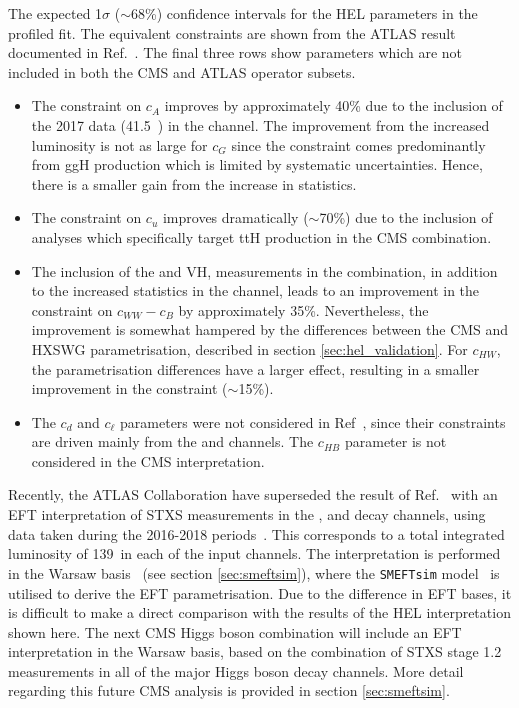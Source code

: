 \begin{table}[htb]
  \centering
  \renewcommand{\arraystretch}{1.3}
  \setlength{\tabcolsep}{15pt}
  \caption[Comparison to the HEL parameter constraints from a previous ATLAS result]
  {
    The expected 1$\sigma$ ($\sim$68\%) confidence intervals for the HEL parameters in the profiled fit. The equivalent constraints are shown from the ATLAS result documented in Ref.~\cite{ATL-PHYS-PUB-2017-018}. The final three rows show parameters which are not included in both the CMS and ATLAS operator subsets.
  }
  \label{tab:hel_atlas}
  
\end{table}

\begin{itemize}
    \item The constraint on $c_A$ improves by approximately 40\% due to the inclusion of the 2017 data (41.5~\fbinv) in the \Hgg channel. The improvement from the increased luminosity is not as large for $c_G$ since the constraint comes predominantly from ggH production which is limited by systematic uncertainties. Hence, there is a smaller gain from the increase in statistics.
    \item The constraint on $c_u$ improves dramatically ($\sim$70\%) due to the inclusion of analyses which specifically target ttH production in the CMS combination. 
    \item The inclusion of the \HWW and VH, \Hbb measurements in the combination, in addition to the increased statistics in the \Hfl channel, leads to an improvement in the constraint on $c_{WW}-c_B$ by approximately 35\%. Nevertheless, the improvement is somewhat hampered by the differences between the CMS and HXSWG parametrisation, described in section \ref{sec:hel_validation}. For $c_{HW}$, the parametrisation differences have a larger effect, resulting in a smaller improvement in the constraint ($\sim$15\%).
    \item The $c_d$ and $c_\ell$ parameters were not considered in Ref~\cite{ATL-PHYS-PUB-2017-018}, since their constraints are driven mainly from the \Hbb and \Htautau channels. The $c_{HB}$ parameter is not considered in the CMS interpretation.
\end{itemize}

Recently, the ATLAS Collaboration have superseded the result of Ref.~\cite{ATL-PHYS-PUB-2017-018} with an EFT interpretation of STXS measurements in the \Hbb, \Hgg and \Hfl decay channels, using data taken during the 2016-2018 periods~\cite{ATLAS-CONF-2020-053}. This corresponds to a total integrated luminosity of 139~\fbinv in each of the input channels. The interpretation is performed in the Warsaw basis~\cite{Grzadkowski:2010es} (see section \ref{sec:smeftsim}), where the \texttt{SMEFTsim} model~\cite{Brivio:2017btx} is utilised to derive the EFT parametrisation. Due to the difference in EFT bases, it is difficult to make a direct comparison with the results of the HEL interpretation shown here. The next CMS Higgs boson combination will include an EFT interpretation in the Warsaw basis, based on the combination of STXS stage 1.2 measurements in all of the major Higgs boson decay channels. More detail regarding this future CMS analysis is provided in section \ref{sec:smeftsim}.

